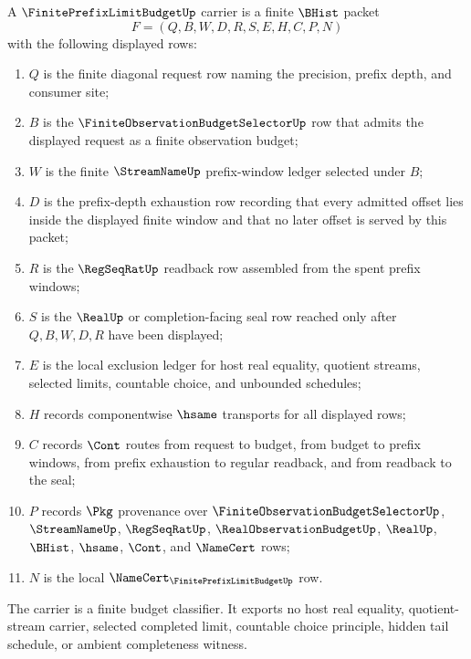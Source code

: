 \begin{definition}
\label{def:finite-prefix-limit-budget-carrier}
A $\FinitePrefixLimitBudgetUp$ carrier is a finite $\BHist$ packet
$$
F=(Q,B,W,D,R,S,E,H,C,P,N)
$$
with the following displayed rows:
\begin{enumerate}
\item $Q$ is the finite diagonal request row naming the precision, prefix depth, and consumer site;
\item $B$ is the $\FiniteObservationBudgetSelectorUp$ row that admits the displayed request as a finite observation budget;
\item $W$ is the finite $\StreamNameUp$ prefix-window ledger selected under $B$;
\item $D$ is the prefix-depth exhaustion row recording that every admitted offset lies inside the displayed finite window and that no later offset is served by this packet;
\item $R$ is the $\RegSeqRatUp$ readback row assembled from the spent prefix windows;
\item $S$ is the $\RealUp$ or completion-facing seal row reached only after $Q,B,W,D,R$ have been displayed;
\item $E$ is the local exclusion ledger for host real equality, quotient streams, selected limits, countable choice, and unbounded schedules;
\item $H$ records componentwise $\hsame$ transports for all displayed rows;
\item $C$ records $\Cont$ routes from request to budget, from budget to prefix windows, from prefix exhaustion to regular readback, and from readback to the seal;
\item $P$ records $\Pkg$ provenance over $\FiniteObservationBudgetSelectorUp$, $\StreamNameUp$, $\RegSeqRatUp$, $\RealObservationBudgetUp$, $\RealUp$, $\BHist$, $\hsame$, $\Cont$, and $\NameCert$ rows;
\item $N$ is the local $\NameCert_{\FinitePrefixLimitBudgetUp}$ row.
\end{enumerate}
The carrier is a finite budget classifier. It exports no host real equality, quotient-stream carrier, selected completed limit, countable choice principle, hidden tail schedule, or ambient completeness witness.
\end{definition}

